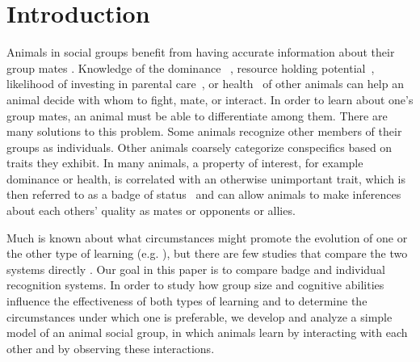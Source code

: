 \section*{Introduction} 
Animals in social groups benefit from having accurate information about their group mates \citep{Seyfarth:2010bh}. Knowledge of the dominance ~\citep{Waal:1986ys,Cowlishaw:1990vn,Bergman:2003qf,Seyfarth:2005ve,Flack:2006uq,Hobson:2015uq}, resource holding potential~\citep{Rhijn:1980uq,Freeman:1985kl,Dick:1990cr,Lemel:1993ve}, likelihood of investing in parental care~\citep{Qvarnstrom:1997fk,Olsen:2010uq}, or health~\citep{Folstad:1992kx,Loyau:2005nx} of other animals can help an animal decide with whom to fight, mate, or interact. In order to learn about one's group mates, an animal must be able to differentiate among them. There are many solutions to this problem. Some animals recognize other members of their groups as individuals. Other animals coarsely categorize conspecifics based on traits they exhibit. In many animals, a property of interest, for example dominance or health, is correlated with an otherwise unimportant trait, which is then referred to as a badge of status~\citep{dawkins1978signals,Rohwer:1981vn,Rohwer:1982fk} and can allow animals to make inferences about each others' quality as mates or opponents or allies. 

Much is known about what circumstances might promote the evolution of one or the other type of learning (e.g. \citep{Whitfield:1987tg,Rohwer:1975fk,Lemel:1993ve,Solberg:1997uq,Tibbetts:2009kx,Remy:2010fk,Sheehan:2014fk}), but there are few studies that compare the two systems directly \citep{sheehan2016evotradeoff}. Our goal in this paper is to compare badge and individual recognition systems. In order to study how group size and cognitive abilities influence the effectiveness of both types of learning and to determine the circumstances under which one is preferable, we develop and analyze a simple model of an animal social group, in which animals learn by interacting with each other and by observing these interactions.  

